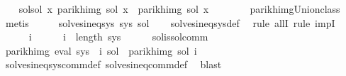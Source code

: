 \begin{isabellebody}
\isanewline
\ \ \isamarkupfalse%
\ sol{\isacharprime}{\kern0pt}{\isacharunderscore}{\kern0pt}sol{\isacharcolon}{\kern0pt}\ {\isachardoublequoteopen}{\isasymforall}x{\isachardot}{\kern0pt}\ parikh{\isacharunderscore}{\kern0pt}img\ {\isacharparenleft}{\kern0pt}{\isacharquery}{\kern0pt}sol{\isacharprime}{\kern0pt}\ x{\isacharparenright}{\kern0pt}\ {\isacharequal}{\kern0pt}\ parikh{\isacharunderscore}{\kern0pt}img\ {\isacharparenleft}{\kern0pt}sol\ x{\isacharparenright}{\kern0pt}{\isachardoublequoteclose}\isanewline
\ \ \ \ \ \ \isamarkupfalse%
\ parikh{\isacharunderscore}{\kern0pt}img{\isacharunderscore}{\kern0pt}Union{\isacharunderscore}{\kern0pt}class\ \isamarkupfalse%
\ metis\isanewline
\isanewline
\ \ \isamarkupfalse%
\ \isamarkupfalse%
\ {\isachardoublequoteopen}solves{\isacharunderscore}{\kern0pt}ineq{\isacharunderscore}{\kern0pt}sys\ sys\ {\isacharquery}{\kern0pt}sol{\isacharprime}{\kern0pt}{\isachardoublequoteclose}\isanewline
\ \ \isamarkupfalse%
\ solves{\isacharunderscore}{\kern0pt}ineq{\isacharunderscore}{\kern0pt}sys{\isacharunderscore}{\kern0pt}def\ \isamarkupfalse%
\ {\isacharparenleft}{\kern0pt}rule\ allI{\isacharcomma}{\kern0pt}\ rule\ impI{\isacharparenright}{\kern0pt}\isanewline
\ \ \ \ \isamarkupfalse%
\ i\isanewline
\ \ \ \ \isamarkupfalse%
\ {\isachardoublequoteopen}i\ {\isacharless}{\kern0pt}\ length\ sys{\isachardoublequoteclose}\isanewline
\ \ \ \ \isamarkupfalse%
\ sol{\isacharunderscore}{\kern0pt}is{\isacharunderscore}{\kern0pt}sol{\isacharunderscore}{\kern0pt}comm\ \isamarkupfalse%
\ {\isachardoublequoteopen}parikh{\isacharunderscore}{\kern0pt}img\ {\isacharparenleft}{\kern0pt}eval\ {\isacharparenleft}{\kern0pt}sys\ {\isacharbang}{\kern0pt}\ i{\isacharparenright}{\kern0pt}\ sol{\isacharparenright}{\kern0pt}\ {\isasymsubseteq}\ parikh{\isacharunderscore}{\kern0pt}img\ {\isacharparenleft}{\kern0pt}sol\ i{\isacharparenright}{\kern0pt}{\isachardoublequoteclose}\isanewline
\ \ \ \ \ \ \isamarkupfalse%
\ solves{\isacharunderscore}{\kern0pt}ineq{\isacharunderscore}{\kern0pt}sys{\isacharunderscore}{\kern0pt}comm{\isacharunderscore}{\kern0pt}def\ solves{\isacharunderscore}{\kern0pt}ineq{\isacharunderscore}{\kern0pt}comm{\isacharunderscore}{\kern0pt}def\ \isamarkupfalse%
\ blast\isanewline
\ \ \ \ \isamarkupfalse%
\ \isamarkupfalse%

\end{isabellebody}
